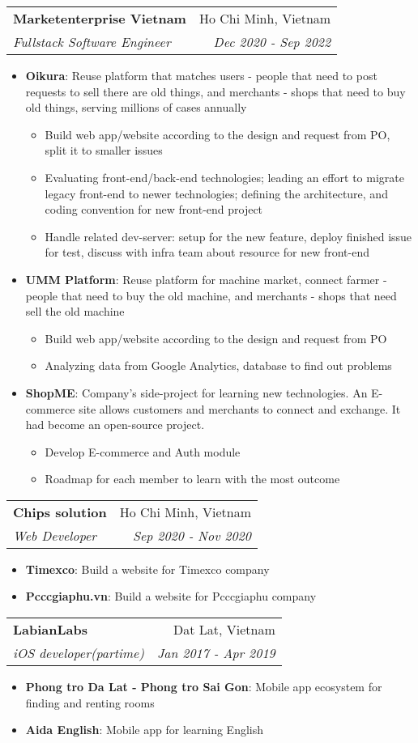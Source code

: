 \documentclass[letterpaper,11pt]{article}
\makeatletter
\newcommand{\resumeItem}[2]{
  \item\small{
    \textbf{#1}{: #2 \vspace{-2pt}}
  }
}
\newcommand{\resumeChildItem}[1]{
  \item{
    {#1}
  } 
}
\newcommand{\resumeSubheading}[4]{
  \vspace{-1pt}\item
    \begin{tabular*}{0.97\textwidth}[t]{l@{\extracolsep{\fill}}r}
      \textbf{#1} & #2 \\
      \textit{\small#3} & \textit{\small #4} \\
    \end{tabular*}\vspace{-5pt}
}
\newcommand{\resumeItemListStart}{\begin{itemize}}
\newcommand{\resumeItemListEnd}{\end{itemize}\vspace{-5pt}}
\newcommand{\resumeChildItemListStart}{\begin{itemize}}
\newcommand{\resumeChildItemListEnd}{\end{itemize}}
\makeatother
\begin{document}
    \resumeSubheading
      {Marketenterprise Vietnam}{Ho Chi Minh, Vietnam}
      {Fullstack Software Engineer}{Dec 2020 - Sep 2022}
      \resumeItemListStart
        \resumeItem{Oikura}
          {Reuse platform that matches users - people that need to post requests to sell there are old things, and merchants - shops that need to buy old things, serving millions of cases annually}
          \resumeChildItemListStart
            \resumeChildItem{Build web app/website according to the design and request from PO, split it to smaller issues}
            \resumeChildItem{Evaluating front-end/back-end technologies; leading an effort to migrate legacy front-end to newer technologies; defining the architecture, and coding convention for new front-end project}
            \resumeChildItem{Handle related dev-server: setup for the new feature, deploy finished issue for test, discuss with infra team about resource for new front-end}
          \resumeChildItemListEnd
        \resumeItem{UMM Platform}
          {Reuse platform for machine market, connect farmer - people that
          need to buy the old machine, and merchants - shops that need sell the old
          machine}
          \resumeChildItemListStart
            \resumeChildItem{Build web app/website according to the design and request from PO}
            \resumeChildItem{Analyzing data from Google Analytics, database to find out problems}
          \resumeChildItemListEnd
        \resumeItem{ShopME}
          {Company's side-project for learning new technologies. An E-commerce site
          allows customers and merchants to connect and exchange. It had become an open-source project.}
          \resumeChildItemListStart
            \resumeChildItem{Develop E-commerce and Auth module}
            \resumeChildItem{Roadmap for each member to learn with the most outcome}
          \resumeChildItemListEnd
        \resumeItemListEnd

    \resumeSubheading
      {Chips solution}{Ho Chi Minh, Vietnam}
      {Web Developer}{Sep 2020 - Nov 2020}
      \resumeItemListStart
        \resumeItem{Timexco}
          {Build a website for Timexco company}
        \resumeItem{Pcccgiaphu.vn}
          {Build a website for Pcccgiaphu company}
      \resumeItemListEnd

    \resumeSubheading
      {LabianLabs}{Dat Lat, Vietnam}
      {iOS developer(partime)}{Jan 2017 - Apr 2019}
      \resumeItemListStart
        \resumeItem{Phong tro Da Lat - Phong tro Sai Gon}
          {Mobile app ecosystem for finding and renting rooms}
        \resumeItem{Aida English}
          {Mobile app for learning English}
      \resumeItemListEnd
\end{document}
